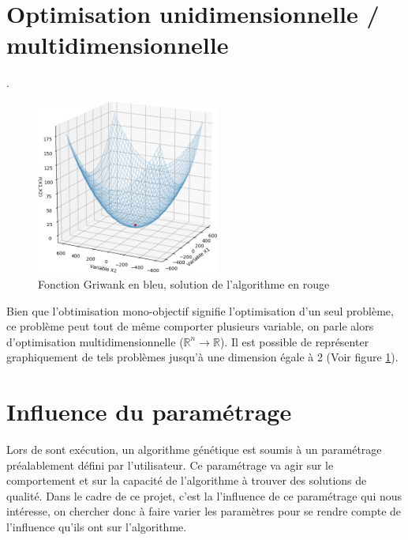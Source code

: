 \documentclass[12pt]{report}
\begin{document}
    \section{Optimisation unidimensionnelle / multidimensionnelle}.
      \begin{figure}
        \centering
        \includegraphics[width=6cm]{img/3,2.png}
        \caption{Fonction Griwank \cite{wiki5} en bleu, solution de l'algorithme en rouge}
        \label{ex_r2}
      \end{figure}
      Bien que l'obtimisation mono-objectif signifie l'optimisation d'un seul problème, ce problème peut tout de même comporter plusieurs variable, on parle alors d'optimisation multidimensionnelle ($\mathbb{R}^n \rightarrow \mathbb{R}$). Il est possible de représenter graphiquement de tels problèmes jusqu'à une dimension égale à 2 (Voir figure \ref{ex_r2}).

    \section{Influence du paramétrage }
      Lors de sont exécution, un algorithme génétique est soumis à un paramétrage préalablement défini par l'utilisateur. Ce paramétrage va agir sur le comportement et sur la capacité de l'algorithme à trouver des solutions de qualité. Dans le cadre de ce projet, c'est la l'influence de ce paramétrage qui nous intéresse, on chercher donc à faire varier les paramètres pour se rendre compte de l'influence qu'ils ont sur l'algorithme.
\end{document}
